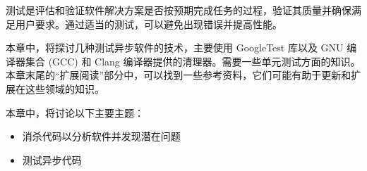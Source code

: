 测试是评估和验证软件解决方案是否按预期完成任务的过程，验证其质量并确保满足用户要求。通过适当的测试，可以避免出现错误并提高性能。

本章中，将探讨几种测试异步软件的技术，主要使用 GoogleTest 库以及 GNU 编译器集合 (GCC) 和 Clang 编译器提供的清理器。需要一些单元测试方面的知识。本章末尾的“扩展阅读”部分中，可以找到一些参考资料，它们可能有助于更新和扩展在这些领域的知识。

本章中，将讨论以下主要主题：

\begin{itemize}
\item
消杀代码以分析软件并发现潜在问题

\item
测试异步代码
\end{itemize}